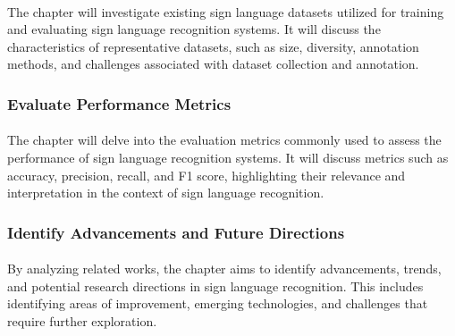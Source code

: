 \paragraph{}
The chapter will investigate existing sign language datasets utilized for training and evaluating sign language recognition systems. It will discuss the characteristics of representative datasets, such as size, diversity, annotation methods, and challenges associated with dataset collection and annotation.
\subsubsection{Evaluate Performance Metrics}
\paragraph{}
The chapter will delve into the evaluation metrics commonly used to assess the performance of sign language recognition systems. It will discuss metrics such as accuracy, precision, recall, and F1 score, highlighting their relevance and interpretation in the context of sign language recognition.
\subsubsection{Identify Advancements and Future Directions} 
\paragraph{}
By analyzing related works, the chapter aims to identify advancements, trends, and potential research directions in sign language recognition. This includes identifying areas of improvement, emerging technologies, and challenges that require further exploration.